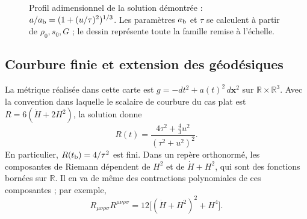 \begin{figure}[htbp]
\centering
{}
\caption{Profil adimensionnel de la solution démontrée :
\(a/a_{\rm b}=(1+(u/\tau)^2)^{1/3}\).
Les paramètres \(a_{\rm b}\) et \(\tau\) se calculent à partir de
\(\rho_0,s_0,G\) ; le dessin représente toute la famille remise à l'échelle.}
\label{vii:vii:fig:rebote-polvo}
\end{figure}

\subsection{Courbure finie et extension des géodésiques}
La métrique réalisée dans cette carte est
\(g=-dt^2+a(t)^2\,d\mathbf x^2\) sur
\(\mathbb R\times\mathbb R^3\). Avec la convention dans laquelle
le scalaire de courbure du cas plat est \(R=6(\dot H+2H^2)\), la solution donne
\[
 R(t)=\frac{4\tau^2+\frac43u^2}{(\tau^2+u^2)^2}.
\]
En particulier, \(R(t_{\rm b})=4/\tau^2\) est fini.
Dans un repère orthonormé, les composantes de Riemann dépendent de
\(H^2\) et de \(\dot H+H^2\), qui sont des fonctions bornées sur
\(\mathbb R\). Il en va de même des contractions polynomiales
de ces composantes ; par exemple,
\[
 R_{\mu\nu\rho\sigma}R^{\mu\nu\rho\sigma}
 =12\bigl[(\dot H+H^2)^2+H^4\bigr].
\]

